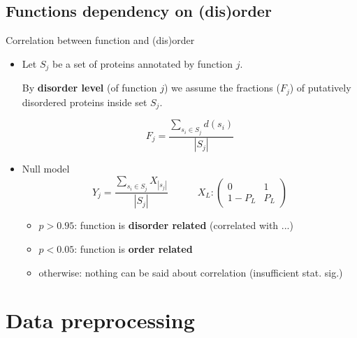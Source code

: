 \documentclass{beamer}
\newcommand{\keyword}[1]{\textbf{#1}}
\newtheorem{definicija}{Definition}
\begin{document}
\subsection{Functions dependency on (dis)order}
\begin{frame}{Correlation between function and (dis)order}

  \begin{itemize}
    \item 
      Let $S_j$ be a set of proteins annotated by function $j$.

      By \keyword{disorder level} (of function $j$) we assume the fractions
      ($F_j$) of putatively disordered proteins inside set $S_j$.

      $$F_j = \dfrac{\sum_{s_i \in S_j} d(s_i)} {|S_j|} $$

      \pause

    \item Null model
      $$
      Y_j = \dfrac {\sum_{s_i \in S_j} {X_{|s_j|}}}{|S_j|}
      \quad \quad \quad
    X_L : \begin{pmatrix} 0 & 1\\ 1-P_L & P_L \end{pmatrix}
      $$

      \pause

      \begin{itemize}
        \item $p>0.95$: function is \keyword{disorder related}
          (correlated with ...)
        \item $p<0.05$: function is \keyword{order related}
        \item otherwise: nothing can be said about correlation (insufficient stat. sig.)
      \end{itemize}


  \end{itemize}

\end{frame}



\section{Data preprocessing}
\end{document}
